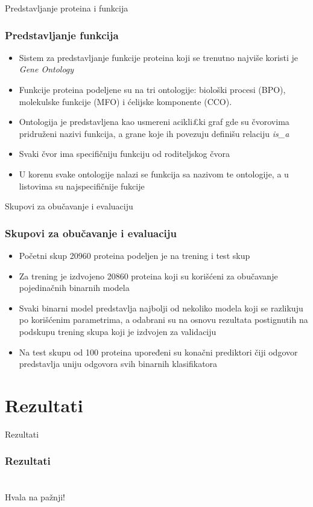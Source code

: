 \documentclass{beamer}
\begin{document}
\begin{frame}{Predstavljanje proteina i funkcija}
	\frametitle{Predstavljanje funkcija}
	\begin{itemize}
		\item Sistem za predstavljanje funkcije proteina koji se
		trenutno najviše koristi je \textit{Gene Ontology}
		
		\item Funkcije proteina podeljene su na tri
		ontologije: biološki procesi (BPO), molekulske funkcije (MFO) i ćelijske komponente (CCO).
		
		\item Ontologija je predstavljena kao usmereni acikli£ki graf gde su čvorovima pridruženi nazivi funkcija, a grane koje ih povezuju definišu relaciju \textit{is\_a}
		
		\item Svaki čvor ima specifičniju funkciju od roditeljskog čvora
	
		\item U korenu svake ontologije nalazi se funkcija sa nazivom te ontologije, a u listovima su najspecifičnije fukcije
	\end{itemize}
\end{frame}



\begin{frame}{Skupovi za obučavanje i evaluaciju}
	\frametitle{Skupovi za obučavanje i evaluaciju}
	\begin{itemize}
		\item Početni skup 20960 proteina podeljen je na trening i test skup
		
		\item Za trening je izdvojeno 20860 proteina koji su korišćeni za obučavanje pojedinačnih binarnih modela
		
		\item Svaki binarni model predstavlja najbolji od nekoliko modela koji se razlikuju po korišćenim parametrima, a odabrani su na osnovu rezultata postignutih na podskupu trening skupa koji je izdvojen za validaciju
		
		\item Na test skupu od 100 proteina upoređeni su konačni prediktori čiji odgovor predstavlja uniju odgovora svih binarnih klasifikatora 
	\end{itemize}
\end{frame}

\section{Rezultati}
\begin{frame}{Rezultati}
	\frametitle{Rezultati}
	
\end{frame}


\section{}
\begin{frame}
	\centering \Large Hvala na pažnji!
\end{frame}
\end{document}
